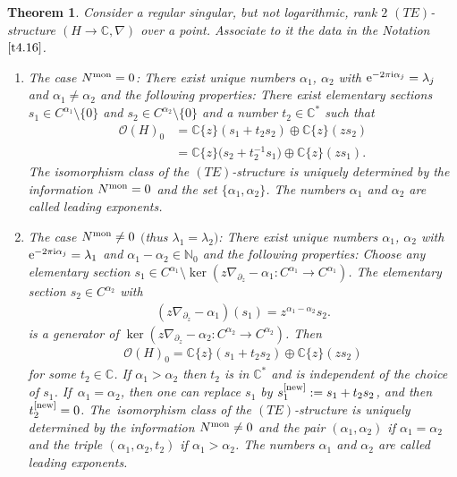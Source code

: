 \documentclass[pdftex]{sigma}%
\numberwithin{equation}{section}
\numberwithin{figure}{section}
\newcommand{\N}{{\mathbb N}}
\newcommand{\C}{{\mathbb C}}
\newcommand{\OO}{{\mathcal O}}
\newcommand{\paa}{\partial}
\newcommand{\nnn}{\nabla}
\newtheorem{Theorem}{Theorem}[section]
\begin{document}
\begin{Theorem}\label{t4.17}
Consider a regular singular, but not logarithmic,
rank $2$ $(TE)$-structure $(H\to\C,\nnn)$ over a point.
Associate to it the data in the Notation~$\ref{t4.16}$.
\begin{enumerate}\itemsep=0pt
\item[$(a)$] The case $N^{\rm mon}=0$:
There exist unique numbers $\alpha_1$, $\alpha_2$
with ${\rm e}^{-2\pi {\rm i}\alpha_j}=\lambda_j$
and $\alpha_1\neq\alpha_2$ and the following properties:
There exist elementary sections $s_1\in C^{\alpha_1}\setminus\{0\}$
and $s_2\in C^{\alpha_2}\setminus\{0\}$ and a number $t_2\in\C^*$
such that
\begin{align}
\label{4.48}
\OO(H)_0&=\C\{z\}(s_1+t_2s_2)\oplus \C\{z\}(zs_2)
\\
&= \C\{z\}\big(s_2+t_2^{-1}s_1\big)\oplus \C\{z\}(zs_1).
\label{4.49}
\end{align}
The isomorphism class of the $(TE)$-structure is
uniquely determined by the information $N^{\rm mon}=0$
and the set $\{\alpha_1,\alpha_2\}$.
The numbers $\alpha_1$ and $\alpha_2$ are called
leading exponents.

\item[$(b)$] The case $N^{\rm mon}\neq 0$ $($thus $\lambda_1=\lambda_2)$:
There exist unique numbers $\alpha_1$, $\alpha_2$
with ${\rm e}^{-2\pi {\rm i}\alpha_j}=\lambda_1$ and
$\alpha_1-\alpha_2\in\N_0$
and the following properties:
Choose any elementary section
$s_1\in C^{\alpha_1}\setminus \ker(z\nnn_{\paa_z}-\alpha_1\colon
C^{\alpha_1}\to C^{\alpha_1})$.
The elementary section $s_2\in C^{\alpha_2}$ with
\begin{gather}\label{4.50}
(z\nnn_{\paa_z}-\alpha_1)(s_1)=z^{\alpha_1-\alpha_2}s_2.
\end{gather}
is a generator of
$\ker(z\nnn_{\paa_z}-\alpha_2\colon C^{\alpha_2}\to C^{\alpha_2})$.
Then
\begin{gather}\label{4.51}
\OO(H)_0=\C\{z\}(s_1+t_2s_2)\oplus \C\{z\}(zs_2)
\end{gather}
for some $t_2\in\C$. If $\alpha_1>\alpha_2$ then
$t_2$ is in $\C^*$ and is independent of the choice of
$s_1$. If~\mbox{$\alpha_1=\alpha_2$}, then one can replace
$s_1$ by $s_1^{\rm[new]}:=s_1+t_2s_2$, and then
$t_2^{\rm[new]}=0$.
The~iso\-morphism class of the $(TE)$-structure is
uniquely determined by the information $N^{\rm mon}\neq 0$
and the pair $(\alpha_1,\alpha_2)$ if $\alpha_1=\alpha_2$
and the triple $(\alpha_1,\alpha_2,t_2)$ if $\alpha_1>\alpha_2$.
The numbers $\alpha_1$ and $\alpha_2$ are called
leading exponents.
\end{enumerate}
\end{Theorem}
\end{document}
